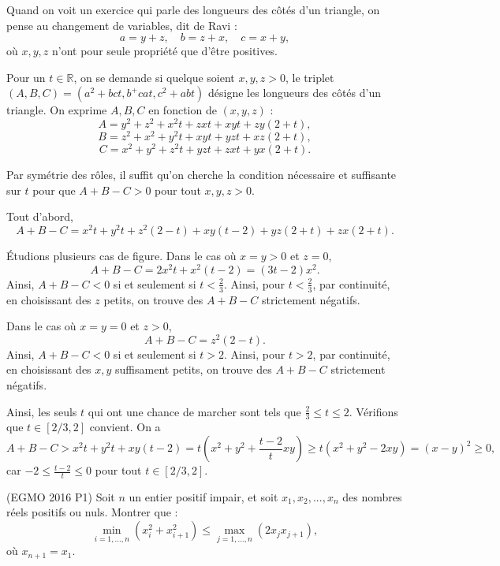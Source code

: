 \begin{sol}
Quand on voit un exercice qui parle des longueurs des côtés d'un triangle, on pense au changement de variables, dit de Ravi :
\[
a=y+z, \quad b=z+x, \quad c=x+y,
\]
où $x,y,z$ n'ont pour seule propriété que d'être positives.

Pour un $t \in \mathbb{R}$, on se demande si quelque soient $x,y,z > 0$, le triplet $(A,B,C)=(a^2+bct,b^+cat,c^2+abt)$ désigne les longueurs des côtés d'un triangle. On exprime $A,B,C$ en fonction de $(x,y,z)$ :
\[
A=y^2+z^2+x^2t+zxt+xyt+zy(2+t),
\]
\[
B=z^2+x^2+y^2t+xyt+yzt+xz(2+t),
\]
\[
C=x^2+y^2+z^2t+yzt+zxt+yx(2+t).
\]

Par symétrie des rôles, il suffit qu'on cherche la condition nécessaire et suffisante sur $t$ pour que $A+B-C>0$ pour tout $x,y,z>0$.

Tout d'abord,
\[
A+B-C=x^2t+y^2t+z^2(2-t)+xy(t-2)+yz(2+t)+zx(2+t).
\]

Étudions plusieurs cas de figure. Dans le cas où $x=y>0$ et $z=0$,
\[
A+B-C=2x^2t+x^2(t-2)=(3t-2)x^2.
\]
Ainsi, $A+B-C<0$ si et seulement si $t<\frac2{3}$. Ainsi, pour $t<\frac2{3}$, par continuité, en choisissant des $z$ petits, on trouve des $A+B-C$ strictement négatifs.

Dans le cas où $x=y=0$ et $z>0$,
\[
A+B-C=z^2(2-t).
\]
Ainsi, $A+B-C<0$ si et seulement si $t>2$. Ainsi, pour $t>2$, par continuité, en choisissant des $x,y$ suffisament petits, on trouve des $A+B-C$ strictement négatifs.

Ainsi, les seuls $t$ qui ont une chance de marcher sont tels que $\frac2{3} \leq t \leq 2$. Vérifions que $t\in[2/3,2]$ convient. On a
\[
A+B-C > x^2t+y^2t+xy(t-2) = t\left(x^2+y^2+\frac{t-2}{t}xy\right) \geq t(x^2+y^2-2xy) = (x-y)^2 \geq 0,
\]
car $-2 \leq \frac{t-2}{t} \leq 0$ pour tout $t\in[2/3,2]$.
\end{sol}






\begin{exo}
(EGMO 2016 P1)
Soit $n$ un entier positif impair, et soit $x_1,x_2,...,x_n$ des nombres réels positifs ou nuls. Montrer que :
\[
\min_{i=1,...,n}(x_i^2+x_{i+1}^2) \leq \max_{j=1,...,n}(2x_jx_{j+1}),
\]
où $x_{n+1}=x_1$.
\end{exo}


